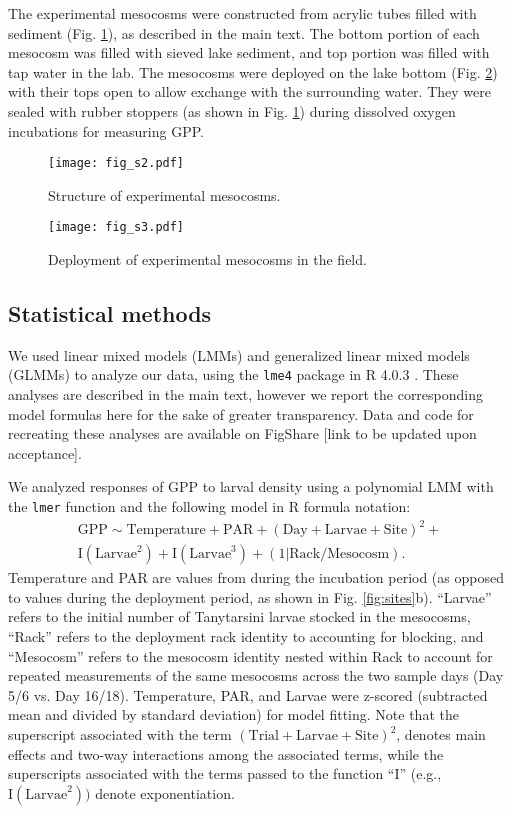 \documentclass[12pt]{article}
\begin{document}
The experimental mesocosms were constructed from acrylic tubes filled with sediment
(Fig. \ref{fig:photo1}),
as described in the main text.
The bottom portion of each mesocosm was filled with sieved lake sediment,
and top portion was filled with tap water in the lab.
The mesocosms were deployed on the lake bottom (Fig. \ref{fig:photo2})
with their tops open to allow exchange with the surrounding water.
They were sealed with rubber stoppers (as shown in Fig. \ref{fig:photo1})
during dissolved oxygen incubations for measuring GPP.


\clearpage

\begin{figure}
\centering
\texttt{[image: fig\_s2.pdf]}
\caption{\label{fig:photo1}
Structure of experimental mesocosms.
}
\end{figure}

\begin{figure}
\centering
\texttt{[image: fig\_s3.pdf]}
\caption{\label{fig:photo2}
Deployment of experimental mesocosms in the field.
}
\end{figure}

\clearpage

\subsection*{Statistical methods}

We used linear mixed models (LMMs) and generalized linear mixed models (GLMMs)
to analyze our data, using the \texttt{lme4} package \citep{lme4} 
in R 4.0.3 \citep{r2020}.
These analyses are described in the main text,
however we report the corresponding model formulas here for the sake 
of greater transparency.
Data and code for recreating these analyses are available 
on FigShare [link to be updated upon acceptance].

We analyzed responses of GPP to larval density using a 
polynomial LMM with the \texttt{lmer} function and the following model 
in R formula notation: 
%
\begin{multline} \label{eq:1}
\text{GPP} \sim \text{Temperature} + \text{PAR} + (\text{Day} + \text{Larvae} + \text{Site})^2 + \\ 
  \text{I}(\text{Larvae}^2) + \text{I}(\text{Larvae}^3) + (1|\text{Rack}/\text{Mesocosm}).
\end{multline}
%
Temperature and PAR are values from during the incubation period 
(as opposed to values during the deployment period, as shown in Fig. \ref{fig:sites}b).
``Larvae'' refers to the initial number of Tanytarsini larvae stocked in the mesocosms,
``Rack'' refers to the deployment rack identity to accounting for blocking,
and ``Mesocosm'' refers to the mesocosm identity nested within Rack 
to account for repeated measurements of the same
mesocosms across the two sample days (Day 5/6 vs. Day 16/18).
Temperature, PAR, and Larvae were z-scored (subtracted mean and divided by standard deviation)
for model fitting.
Note that the superscript associated with the term 
$(\text{Trial} + \text{Larvae} + \text{Site})^2$,
denotes main effects and two-way interactions among the associated terms,
while the superscripts associated with the terms passed to the function ``I''
(e.g., $\text{I}(\text{Larvae}^2))$
denote exponentiation.
\end{document}
